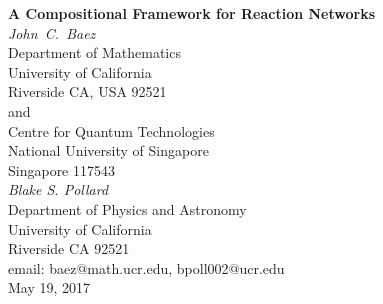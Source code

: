 \documentclass{compositionalityarticle}
\theoremstyle{plain}
\theoremstyle{remark}
\begin{document}
\begin{center}   
  {\bf A Compositional Framework for Reaction Networks \\}   
  \vspace{0.3cm}
  {\em John\ C.\ Baez \\}
  \vspace{0.3cm}
  {\small
 Department of Mathematics \\
    University of California \\
  Riverside CA, USA 92521 \\ and \\
 Centre for Quantum Technologies  \\
    National University of Singapore \\
    Singapore 117543  \\    } 
  \vspace{0.4cm}
{\em Blake S. Pollard \\ }
\vspace{0.3cm}
{\small Department of Physics and Astronomy \\
University of California \\
Riverside CA 92521 \\ }
  \vspace{0.3cm}   
  {\small email:  baez@math.ucr.edu, bpoll002@ucr.edu\\} 
  \vspace{0.3cm}   
  {\small May 19, 2017}
  \vspace{0.3cm}   
\end{center}   


\begin{abstract}
Reaction networks, or equivalently Petri nets, are a general framework for describing processes in which entities of various kinds interact and turn into other entities.  In chemistry, where the reactions are assigned `rate constants', any reaction network gives rise to a nonlinear dynamical system called its `rate equation'.   Here we generalize these ideas to   `open' reaction networks, which allow entities to flow in and out at certain designated inputs and outputs.  We treat open reaction networks as morphisms in a category.  Composing two such morphisms connects the outputs of the first to the inputs of the second. We construct a functor sending any open reaction network to its corresponding `open dynamical system'.  This provides a compositional framework for studying the dynamics of reaction networks.  We then turn to statics: that is, steady state solutions of open dynamical systems.   We construct a `black-boxing' functor that sends any open dynamical system to the relation that it imposes between input and output variables in steady states.  This extends our earlier work on black-boxing for Markov processes.
\end{abstract}
\end{document}

